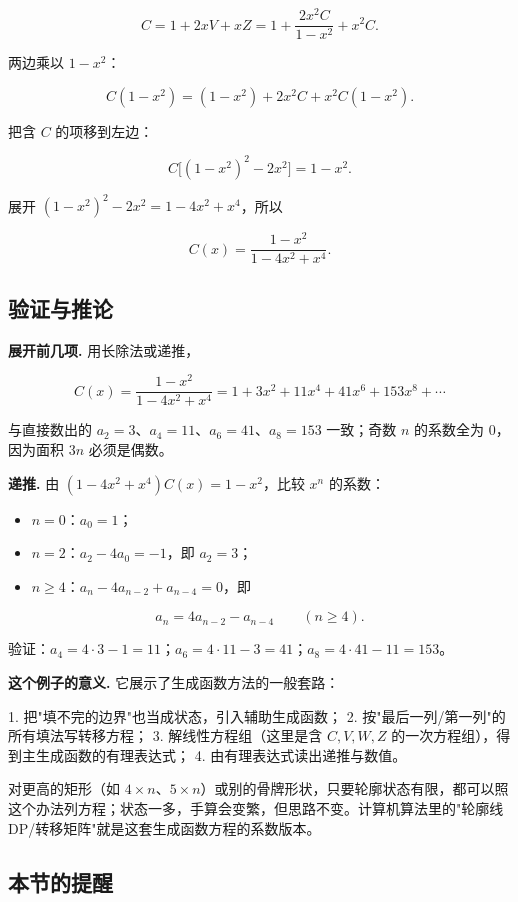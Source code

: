 \[
C=1+2xV+xZ
=1+\frac{2x^2C}{1-x^2}+x^2C.
\]

两边乘以 $1-x^2$：

\[
C(1-x^2)=(1-x^2)+2x^2C+x^2C(1-x^2).
\]

把含 $C$ 的项移到左边：

\[
C\bigl[(1-x^2)^2-2x^2\bigr]=1-x^2.
\]

展开 $(1-x^2)^2-2x^2=1-4x^2+x^4$，所以

\[
C(x)=\frac{1-x^2}{1-4x^2+x^4}.
\]

\subsection{验证与推论}


\textbf{展开前几项.} 用长除法或递推，

\[
C(x)=\frac{1-x^2}{1-4x^2+x^4}
=1+3x^2+11x^4+41x^6+153x^8+\cdots
\]

与直接数出的 $a_2=3$、$a_4=11$、$a_6=41$、$a_8=153$ 一致；奇数 $n$ 的系数全为 $0$，因为面积 $3n$ 必须是偶数。

\textbf{递推.} 由 $(1-4x^2+x^4)C(x)=1-x^2$，比较 $x^n$ 的系数：

\begin{itemize}
\item $n=0$：$a_0=1$；
\item $n=2$：$a_2-4a_0=-1$，即 $a_2=3$；
\item $n\ge4$：$a_n-4a_{n-2}+a_{n-4}=0$，即
\end{itemize}


\[
a_n=4a_{n-2}-a_{n-4}\qquad(n\ge4).
\]

验证：$a_4=4\cdot3-1=11$；$a_6=4\cdot11-3=41$；$a_8=4\cdot41-11=153$。

\textbf{这个例子的意义.} 它展示了生成函数方法的一般套路：

1. 把"填不完的边界"也当成状态，引入辅助生成函数；
2. 按"最后一列/第一列"的所有填法写转移方程；
3. 解线性方程组（这里是含 $C,V,W,Z$ 的一次方程组），得到主生成函数的有理表达式；
4. 由有理表达式读出递推与数值。

对更高的矩形（如 $4\times n$、$5\times n$）或别的骨牌形状，只要轮廓状态有限，都可以照这个办法列方程；状态一多，手算会变繁，但思路不变。计算机算法里的"轮廓线 DP/转移矩阵"就是这套生成函数方程的系数版本。

\subsection{本节的提醒}


